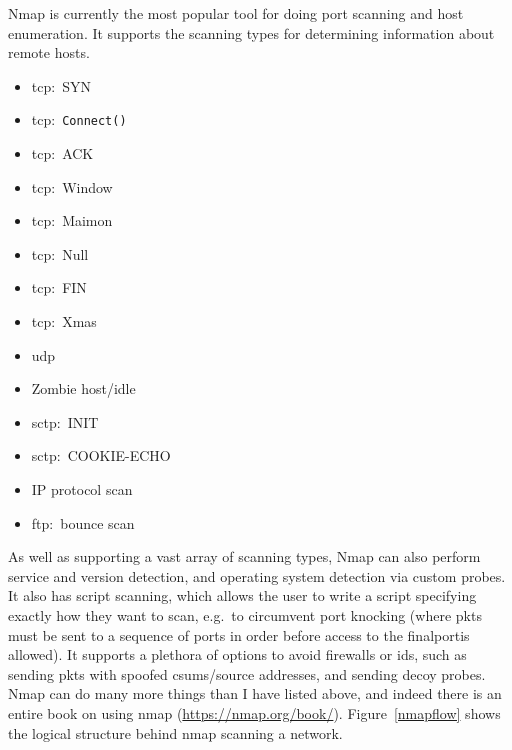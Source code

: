 \documentclass[titlepage]{article}
\begin{document}
Nmap is currently the most popular tool for doing \gls{port} scanning and host enumeration.
It supports the scanning types for determining information about remote hosts.

\begin{itemize}
  \item{\gls{tcp}:\ SYN}
  \item{\gls{tcp}:\ \verb|Connect()|}
  \item{\gls{tcp}:\ ACK}
  \item{\gls{tcp}:\ Window}
  \item{\gls{tcp}:\ Maimon}
  \item{\gls{tcp}:\ Null}
  \item{\gls{tcp}:\ FIN}
  \item{\gls{tcp}:\ Xmas}
  \item{\gls{udp}}
  \item{Zombie host/idle}
  \item{\gls{sctp}:\ INIT}
  \item{\gls{sctp}:\ COOKIE-ECHO}
  \item{IP protocol scan}
  \item{\gls{ftp}:\ bounce scan}
\end{itemize}

As well as supporting a vast array of scanning types,
Nmap can also perform \gls{service} and version detection,
and operating system detection via custom probes. It also has script scanning, which allows the 
user to write a script specifying exactly how they want to scan, e.g.\ to circumvent \gls{port 
knocking} (where \glspl{pkt} must be sent to a sequence of \glspl{port} in order before access to 
the final\gls{port}is allowed). It supports a plethora of options to avoid firewalls or 
\gls{ids}, such as sending \glspl{pkt} with spoofed \glspl{csum}/source addresses, and sending decoy 
probes. Nmap can do many more things than I have listed above, and indeed there is an
entire book on using nmap (\href{https://nmap.org/book/}{https://nmap.org/book/}).
Figure~\ref{nmapflow} shows the logical structure behind nmap scanning a network.
\end{document}

